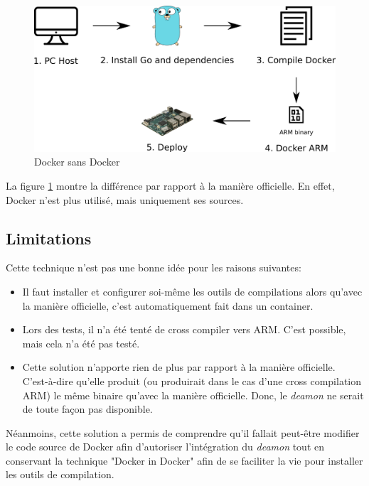 \documentclass[11pt,a4paper,oneside]{report}
\begin{document}
\begin{figure}[H]
    \begin{center}
        \includegraphics[scale=0.6]{img/docker_without_docker}
    \end{center}
    \caption{Docker sans Docker}
    \label{fig_docker_without_docker}
\end{figure}

La figure \ref{fig_docker_without_docker} montre la différence par rapport à la manière officielle. En effet, Docker n'est plus utilisé, mais uniquement ses sources.

\subsection{Limitations}

Cette technique n'est pas une bonne idée pour les raisons suivantes:

\begin{itemize}
\item Il faut installer et configurer soi-même les outils de compilations alors qu'avec la manière officielle, c'est automatiquement fait dans un container.
\item Lors des tests, il n'a été tenté de cross compiler vers ARM. C'est possible, mais cela n'a été pas testé.
\item Cette solution n'apporte rien de plus par rapport à la manière officielle. C'est-à-dire qu'elle produit (ou produirait dans le cas d'une cross compilation ARM) le même binaire qu'avec la manière officielle. Donc, le \textit{deamon} ne serait de toute façon pas disponible.

\end{itemize}

Néanmoins, cette solution a permis de comprendre qu'il fallait peut-être modifier le code source de Docker afin d'autoriser l'intégration du \textit{deamon} tout en conservant la technique "Docker in Docker" afin de se faciliter la vie pour installer les outils de compilation.
\end{document}
